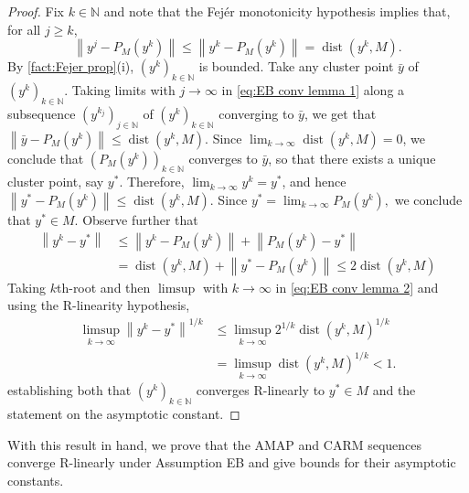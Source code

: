 \documentclass[smallextended,numbook,nospthms]{svjour3}
\theoremstyle{plain}
\theoremstyle{definition}
\def\NN{\mathds N}
\DeclareMathOperator{\dist}{dist}
\begin{document}
\begin{proof}
	Fix $k \in \NN$ and note that the Fejér monotonicity hypothesis implies that, for all $j \geq k$,
	\[
	\left\|y^{j}-P_{M}\left(y^{k}\right)\right\| \leq\left\|y^{k}-P_{M}\left(y^{k}\right)\right\|=\operatorname{dist}\left(y^{k}, M\right). \label{eq:EB conv lemma 1}
	\]
	By \cref{fact:Fejer prop}(i), $\left(y^{k}\right)_{k \in \NN}$ is bounded. Take any cluster point $\bar{y}$ of $\left(y^{k}\right)_{k \in \NN}$. Taking limits with $j \rightarrow \infty$ in \cref{eq:EB conv lemma 1} along a subsequence $\left(y^{k_{j}}\right)_{j \in \NN}$ of $\left(y^{k}\right)_{k \in \NN}$ converging to $\bar{y}$, we get that $\left\|\bar{y}-P_{M}\left(y^{k}\right)\right\| \leq \dist\left(y^{k}, M\right)$. Since $\lim _{k \rightarrow \infty} \dist\left(y^{k}, M\right)=0$, we conclude that $\left(P_{M}\left(y^{k}\right)\right)_{k \in \NN}$ converges to $\bar{y}$, so that
	there exists a unique cluster point, say $y^{*}$. Therefore, $\lim _{k \rightarrow \infty} y^{k}=y^{*}$, and hence $\left\|y^{*}-P_{M}\left(y^{k}\right)\right\| \leq \dist\left(y^{k}, M\right)$. Since $y^{*}=\lim _{k \rightarrow \infty} P_{M}\left(y^{k}\right),$ we conclude that $y^{*} \in M$. Observe further that
	\begin{align}
		\left\|y^{k}-y^{*}\right\|
		&\leq \left\|y^{k}-P_{M}\left(y^{k}\right)\right\|+\left\|P_{M}\left(y^{k}\right)-y^{*}\right\| \\
		&=\operatorname{dist}\left(y^{k}, M\right)+\left\|y^{*}-P_{M}\left(y^{k}\right)\right\| \leq 2 \dist\left(y^{k}, M\right) \label{eq:EB conv lemma 2}
	\end{align}
	Taking $k$th-root and then $\limsup$ with $k \rightarrow \infty$ in \cref{eq:EB conv lemma 2} and using the R-linearity hypothesis,
	\begin{align}
		\limsup _{k \rightarrow \infty}\left\|y^{k}-y^{*}\right\|^{1 / k} & \leq \limsup _{k \rightarrow \infty} 2^{1/k} \dist\left(y^{k}, M\right)^{1/k} \\
		&=\limsup _{k \rightarrow \infty} \dist\left(y^{k}, M\right)^{1/k}<1.
	\end{align}
	establishing both that $\left(y^{k}\right)_{k \in \NN}$ converges R-linearly to $y^{*} \in M$ and the statement on the asymptotic constant.
\end{proof}

With this result in hand, we prove that the AMAP and CARM sequences converge R-linearly under Assumption EB and give bounds for their asymptotic constants.
\end{document}
